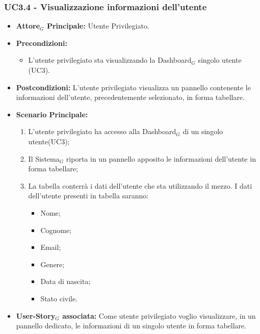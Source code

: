 \documentclass[10pt]{article}
\begin{document}
\begin{justify}
\subsubsection{\textbf{UC3.4 - Visualizzazione informazioni dell'utente}}
\label{UC3.4}
\begin{itemize}
     \item \textbf{Attore$_G$ Principale:} Utente Privilegiato.
     \item \textbf{Precondizioni:}
        \begin{itemize}
    		\item L'utente privilegiato sta visualizzando la Dashboard$_G$ singolo utente (UC3).
        \end{itemize}
      \item \textbf{Postcondizioni:} L'utente privilegiato visualizza un pannello contenente le informazioni dell'utente, precedentemente selezionato, in forma tabellare. 
      \item \textbf{Scenario Principale:}
        \begin{enumerate}
            \item L'utente privilegiato ha accesso alla Dashboard$_G$ di un singolo utente(UC3);
            \item Il Sistema$_G$ riporta  in un pannello apposito le informazioni dell'utente in forma tabellare;
            \item La tabella conterrà i dati dell'utente che sta utilizzando il mezzo. I dati dell'utente presenti in tabella saranno:
              \begin{itemize}
              \item Nome;
              \item Cognome;
              \item Email;
              \item Genere;
              \item Data di nascita;
              \item Stato civile.
              \end{itemize}
        \end{enumerate}
     \item \textbf{User-Story$_G$ associata:}
       Come utente privilegiato voglio visualizzare, in un pannello dedicato, le informazioni di un singolo utente in forma tabellare.
\end{itemize}


\end{justify}
\end{document}
